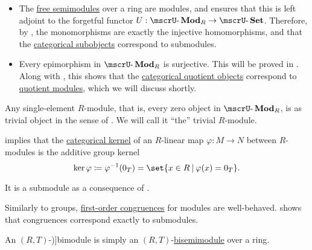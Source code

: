 \begin{definition}
\begin{thmenum}
\begin{itemize}
      \item The \hyperref[def:free_semimodule]{free semimodules} over a ring are modules, and  ensures that this is left adjoint to the forgetful functor \( U: \ucat{Mod}_R \to \ucat{Set} \). Therefore, by , the monomorphisms are exactly the injective homomorphisms, and that the \hyperref[def:subobject_and_quotient]{categorical subobjects} correspond to submodules.

      \item Every epimorphism in \( \ucat{Mod}_R \) is surjective. This will be proved in . Along with , this shows that the \hyperref[def:subobject_and_quotient]{categorical quotient objects} correspond to \hyperref[def:module/quotient]{quotient modules}, which we will discuss shortly.
    \end{itemize}

     Any single-element \( R \)-module, that is, every zero object in \( \ucat{Mod}_R \), is as trivial object in the sense of . We will call it \enquote{the} trivial \( R \)-module.

      implies that the \hyperref[def:zero_morphisms/kernel]{categorical kernel} of an \( R \)-linear map \( \varphi: M \to N \) between \( R \)-modules is the additive group kernel
    \begin{equation*}
      \ker \varphi \coloneqq \varphi^{-1}(0_T) = \set{ x \in R \given \varphi(x) = 0_T }.
    \end{equation*}

    It is a submodule as a consequence of .

     Similarly to groups, \hyperref[def:first_order_congruence]{first-order congruences} for modules are well-behaved.  shows that congruences correspond exactly to submodules.

     An \( (R, T) \)-\term[ru=бимодуль (\cite[248]{МальцевЖуравлёв2014})]{bimodule} is simply an \( (R, T) \)-\hyperref[def:semimodule/bisemimodule]{bisemimodule} over a ring.
  \end{thmenum}
\end{definition}

